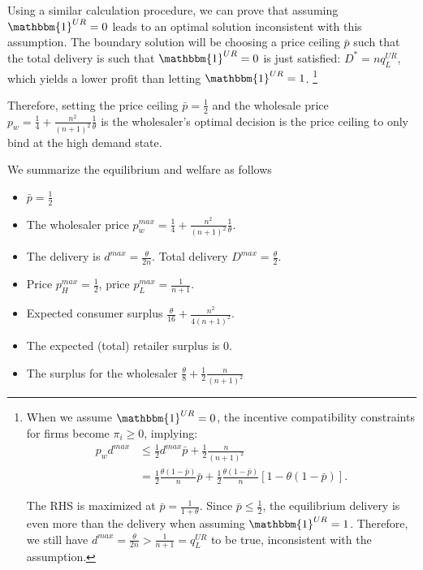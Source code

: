 \documentclass[12pt]{article}
\begin{document}
Using a similar calculation procedure, we can prove that assuming $\mathbbm{1}^{UR} = 0$ leads to an optimal solution inconsistent with this assumption. The boundary solution will be choosing a price ceiling $\bar{p}$ such that the total delivery is such that $\mathbbm{1}^{UR} = 0$ is just satisfied: $D^* = nq^{UR}_L$, which yields a lower profit than letting $\mathbbm{1}^{UR} = 1$.
\footnote{
	When we assume $\mathbbm{1}^{UR} = 0$, the incentive compatibility constraints for firms become $\pi_i \geq 0$, implying:
	\begin{equation}
		\begin{aligned}
			p_wd^{max} &\leq  \frac{1}{2}d^{max}\bar{p} + \frac{1}{2}\frac{n}{(n + 1)^2} \\
			&= \frac{1}{2}\frac{\theta(1 - \bar{p})}{n}\bar{p} + \frac{1}{2}\frac{\theta(1-\bar{p})}{n}\left[1 - \theta(1 - \bar{p})\right].
		\end{aligned}
	\end{equation}
	
	The RHS is maximized at $\bar{p} = \frac{1}{1 + \theta}$. Since $\bar{p} \leq \frac{1}{2}$, the equilibrium delivery is even more than the delivery when assuming $\mathbbm{1}^{UR} = 1$. Therefore, we still have $d^{max} = \frac{\theta}{2n} > \frac{1}{n + 1} = q^{UR}_L$ to be true, inconsistent with the assumption.
} 

Therefore, setting the price ceiling $\bar{p} = \frac{1}{2}$ and the wholesale price $ p_w =\frac{1}{4} + \frac{n^2}{(n + 1)^2}\frac{1}{\theta}$ is the wholesaler's optimal decision is the price ceiling to only bind at the high demand state.  

We summarize the equilibrium and welfare as follows
\begin{itemize}
	\item $\bar{p} = \frac{1}{2}$
	\item The wholesaler price  $ p_w^{max} =\frac{1}{4} + \frac{n^2}{(n + 1)^2}\frac{1}{\theta}$. 
	\item The delivery is $d^{max} = \frac{\theta}{2n}$. Total delivery $D^{max} = \frac{\theta }{2}$. 
	\item Price $p^{max}_{H} = \frac{1}{2}$, price $p^{max}_L = \frac{1}{n+ 1}$.
	\item Expected consumer surplus $\frac{\theta}{16} + \frac{n^2}{4(n + 1)^2}$. 
	\item The expected (total) retailer surplus is 0. 
	\item The surplus for the wholesaler $\frac{\theta}{8} + \frac{1}{2}\frac{n}{(n + 1)^2}$
\end{itemize}    
\end{document}

